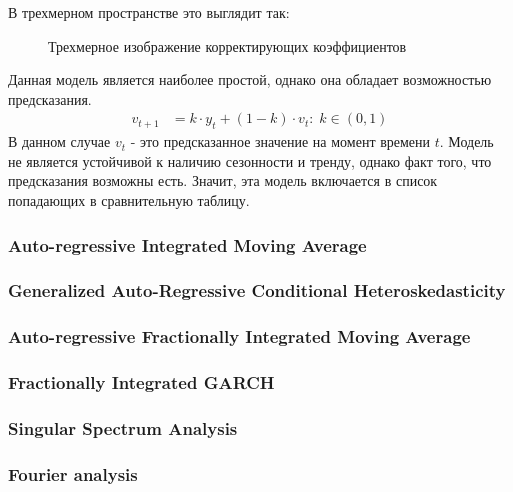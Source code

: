 			В трехмерном пространстве это выглядит так:
			\begin{figure}[H]
				\centering
				\caption{Трехмерное изображение корректирующих коэффициентов}
			\end{figure}
			Данная модель является наиболее простой, однако она обладает возможностью предсказания.
			\begin{equation}
				\begin{split}
					v_{t + 1} & = k \cdot y_t + (1 - k) \cdot v_t: \; k \in (0, 1)
				\end{split}
			\end{equation}
			В данном случае $v_t$ - это предсказанное значение на момент времени $t$. Модель не является устойчивой к наличию сезонности и тренду, однако факт того, что предсказания возможны есть. Значит, эта модель включается в список попадающих в сравнительную таблицу.
		\subsubsection{Auto-regressive Integrated Moving Average}
		\subsubsection{Generalized Auto-Regressive Conditional Heteroskedasticity}
		\subsubsection{Auto-regressive Fractionally Integrated Moving Average}
		\subsubsection{Fractionally Integrated GARCH}
		\subsubsection{Singular Spectrum Analysis}
		\subsubsection{Fourier analysis} \label{link::fourier_analysis}
